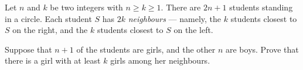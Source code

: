Let $n$ and $k$ be two integers with $n \geq k \geq 1$. There are $2n + 1$ students standing in a circle. Each student $S$ has $2k$ \emph{neighbours} --- namely, the $k$ students closest to $S$ on the right, and the $k$ students closest to $S$ on the left.

Suppose that $n + 1$ of the students are girls, and the other $n$ are boys. Prove that there is a girl with at least $k$ girls among her neighbours.
